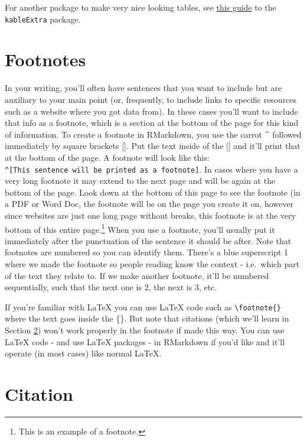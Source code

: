 \documentclass[
  12pt,
  openany]{book}
\begin{document}
For another package to make very nice looking tables, see \href{https://cran.r-project.org/web/packages/kableExtra/vignettes/awesome_table_in_html.html}{this guide} to the \texttt{kableExtra} package.

\hypertarget{footnotes}{%
\section{Footnotes}\label{footnotes}}

In your writing, you'll often have sentences that you want to include but are auxiliary to your main point (or, frequently, to include links to specific resources such as a website where you got data from). In these cases you'll want to include that info as a footnote, which is a section at the bottom of the page for this kind of information. To create a footnote in RMarkdown, you use the carrot \^{} followed immediately by square brackets {[}{]}. Put the text inside of the {[}{]} and it'll print that at the bottom of the page. A footnote will look like this: \texttt{\^{}{[}This\ sentence\ will\ be\ printed\ as\ a\ footnote{]}}. In cases where you have a very long footnote it may extend to the next page and will be again at the bottom of the page. Look down at the bottom of this page to see the footnote (in a PDF or Word Doc, the footnote will be on the page you create it on, however since websites are just one long page without breaks, this footnote is at the very bottom of this entire page.\footnote{This is an example of a footnote.} When you use a footnote, you'll usually put it immediately after the punctuation of the sentence it should be after. Note that footnotes are numbered so you can identify them. There's a blue superscript 1 where we made the footnote so people reading know the context - i.e.~which part of the text they relate to. If we make another footnote, it'll be numbered sequentially, such that the next one is 2, the next is 3, etc.

If you're familiar with LaTeX you can use LaTeX code such as \texttt{\textbackslash{}footnote\{\}} where the text goes inside the \{\}. But note that citations (which we'll learn in Section \ref{citation}) won't work properly in the footnote if made this way. You can use LaTeX code - and use LaTeX packages - in RMarkdown if you'd like and it'll operate (in most cases) like normal LaTeX.

\hypertarget{citation}{%
\section{Citation}\label{citation}}
\end{document}
